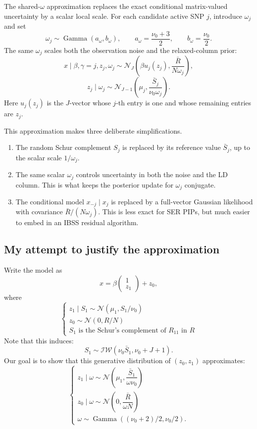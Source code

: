 \documentclass[11pt]{article}
\newcommand{\Rbar}{\bar R}
\newcommand{\Normal}{\mathcal N}
\newcommand{\Gam}{\operatorname{Gamma}}
\begin{document}
The shared-\(\omega\) approximation replaces the exact conditional
matrix-valued uncertainty by a scalar local scale. For each candidate active
SNP \(j\), introduce \(\omega_j\) and set
\[
\omega_j
\sim
\Gam(a_\omega,b_\omega),
\qquad
a_\omega=\frac{\nu_0+3}{2},
\qquad
b_\omega=\frac{\nu_0}{2}.
\]
The same \(\omega_j\) scales both the observation noise and the relaxed-column
prior:
\[
x\mid \beta,\gamma=j,z_j,\omega_j
\sim
\Normal_J\left(
\beta u_j(z_j),
\frac{\Rbar}{N\omega_j}
\right),
\]
\[
z_j\mid \omega_j
\sim
\Normal_{J-1}\left(
\mu_j,
\frac{\bar S_j}{\nu_0\omega_j}
\right).
\]
Here \(u_j(z_j)\) is the \(J\)-vector whose \(j\)-th entry is one and whose
remaining entries are \(z_j\).

This approximation makes three deliberate simplifications.

\begin{enumerate}[leftmargin=*]
\item The random Schur complement \(S_j\) is replaced by its reference value
\(\bar S_j\), up to the scalar scale \(1/\omega_j\).
\item The same scalar \(\omega_j\) controls uncertainty in both the noise and
the LD column. This is what keeps the posterior update for \(\omega_j\)
conjugate.
\item The conditional model \(x_{-j}\mid x_j\) is replaced by a full-vector
Gaussian likelihood with covariance \(\Rbar/(N\omega_j)\). This is less exact
for SER PIPs, but much easier to embed in an IBSS residual algorithm.
\end{enumerate}

\subsection*{My attempt to justify the approximation}
Write the model as 
\begin{equation}
x = \beta \begin{pmatrix} 1 \\ z_1 \end{pmatrix} + z_0,
\end{equation}
where
\begin{equation}\label{eq:generative-z0-z1-by-R}
\begin{cases}
z_1 \mid S_1 \sim \Normal(\mu_1, S_1 / \nu_0) \\
z_0 \sim \Normal(0,  R / N)\\
S_1 \text{ is the Schur's complement of } R_{11} \text{ in } R
\end{cases}
\end{equation}
Note that this induces:
$$S_1 \sim \mathcal{IW}(\nu_0 \bar S_1, \nu_0 + J + 1).$$
Our goal is to show that this generative distribution of $(z_0, z_1)$ approximates:
\begin{equation}\label{eq:generative-z0-z1-by-omega}
\begin{cases}
z_1 \mid \omega \sim \Normal\left(\mu_1,  \dfrac{\bar S_1}{\omega \nu_0}\right) \\
z_0 \mid \omega \sim \Normal \left(0,  \dfrac{\bar R}{\omega N}\right)\\
\omega \sim \Gam((\nu_0 + 2)/ 2, \nu_0 / 2).
\end{cases}
\end{equation}
\end{document}
